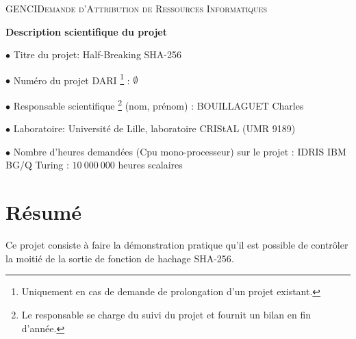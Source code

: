 \documentclass[
    a4paper, 
    12pt, onecolumn,
]{article}
\newcommand{\rubrique}{\bigskip \noindent $\bullet$ }
\begin{document}

\newcommand{\sha}{\textsf{SHA-256}\xspace} 
\noindent GENCI\hfill \textsc{Demande d'Attribution de Ressources Informatiques}

\begin{center}
\Large  \bf
Description scientifique du projet
\end{center}
\bigskip

\rubrique  Titre du projet:  
\hfill
Half-Breaking \sha



\rubrique  Num\'ero du projet DARI
\footnote{ Uniquement en cas de demande de prolongation d'un projet
  existant.} : 
\hfill
$\emptyset$

\rubrique  Responsable scientifique
\footnote{ Le responsable se charge du suivi du projet et fournit un bilan
  en fin d'ann\'ee.} 
(nom, pr\'enom) :  
\hfill
BOUILLAGUET Charles


\rubrique Laboratoire:  
\hfill
Université de Lille, laboratoire CRIStAL (UMR 9189)


\rubrique  Nombre d'heures demand\'ees (Cpu mono-processeur) sur le projet :
   \newline IDRIS IBM BG/Q Turing     : \hfill  $10\ 000\ 000$ heures scalaires

\section{R\'esum\'e}



Ce projet consiste à faire la démonstration pratique qu'il est possible de
contrôler la moitié de la sortie de fonction de hachage \sha.
\end{document}
